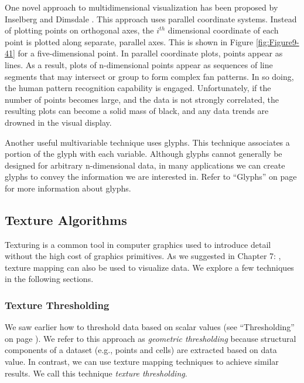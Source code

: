 One novel approach to multidimensional visualization has been proposed by Inselberg and Dimsdale \cite{Inselberg87}. This approach uses parallel coordinate systems. Instead of plotting points on orthogonal axes, the $i^{th}$ dimensional coordinate of each point is plotted along separate, parallel axes. This is shown in Figure \ref{fig:Figure9-41} for a five-dimensional point. In parallel coordinate plots, points appear as lines. As a result, plots of n-dimensional points appear as sequences of line segments that may intersect or group to form complex fan patterns. In so doing, the human pattern recognition capability is engaged. Unfortunately, if the number of points becomes large, and the data is not strongly correlated, the resulting plots can become a solid mass of black, and any data trends are drowned in the visual display.

Another useful multivariable technique uses glyphs. This technique associates a portion of the glyph with each variable. Although glyphs cannot generally be designed for arbitrary n-dimensional data, in many applications we can create glyphs to convey the information we are interested in. Refer to ``Glyphs'' on page \pageref{subsec:glyphs} for more information about glyphs.

\subsection{Texture Algorithms}
\label{subsec:texture_algorithms}

Texturing is a common tool in computer graphics used to introduce detail without the high cost of graphics primitives. As we suggested in Chapter 7: , texture mapping can also be used to visualize data. We explore a few techniques in the following sections.

\subsubsection{Texture Thresholding}

We saw earlier how to threshold data based on scalar values (see ``Thresholding'' on page \pageref{subsubsec:thresholding}). We refer to this approach as \emph{geometric thresholding} because structural components of a dataset (e.g., points and cells) are extracted based on data value. In contrast, we can use texture mapping techniques to achieve similar results. We call this technique \emph{texture thresholding}.

